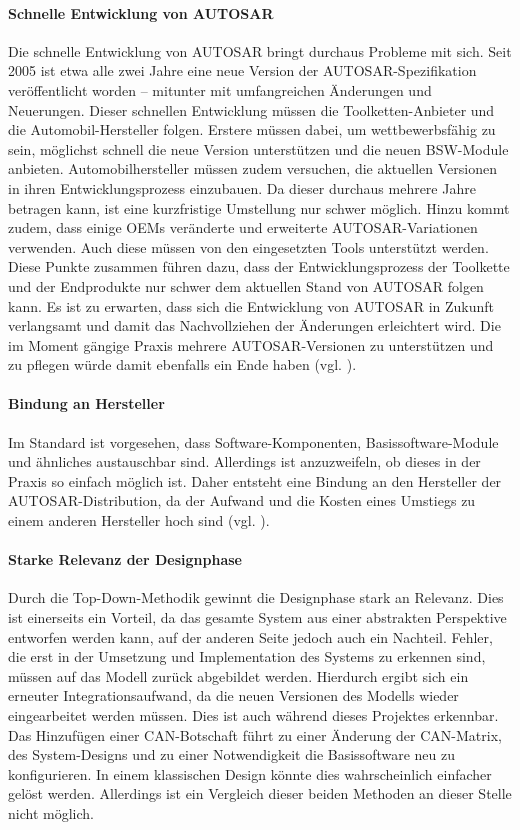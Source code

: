 \documentclass[
  a4paper,					    %
  twoside,
  DIV=calc,     				%
  bibliography=totoc,
  cleardoublepage=empty,
  ngerman,     					%
  final       					%
]{scrbook}
\begin{document}
\paragraph{Schnelle Entwicklung von AUTOSAR}
Die schnelle Entwicklung von AUTOSAR bringt durchaus Probleme mit sich. Seit 2005 ist etwa alle zwei Jahre eine neue Version der AUTOSAR-Spezifikation veröffentlicht worden -- mitunter mit umfangreichen Änderungen und Neuerungen. Dieser schnellen Entwicklung müssen die Toolketten-Anbieter und die Automobil-Hersteller folgen. Erstere müssen dabei, um wettbewerbsfähig zu sein, möglichst schnell die neue Version unterstützen und die neuen BSW-Module anbieten. Automobilhersteller müssen zudem versuchen, die aktuellen Versionen in ihren Entwicklungsprozess einzubauen. Da dieser durchaus mehrere Jahre betragen kann, ist eine kurzfristige Umstellung nur schwer möglich. Hinzu kommt zudem, dass einige OEMs veränderte und erweiterte AUTOSAR-Variationen verwenden. Auch diese müssen von den eingesetzten Tools unterstützt werden. Diese Punkte zusammen führen dazu, dass der Entwicklungsprozess der Toolkette und der Endprodukte nur schwer dem aktuellen Stand von AUTOSAR folgen kann. Es ist zu erwarten, dass sich die Entwicklung von AUTOSAR in Zukunft verlangsamt und damit das Nachvollziehen der Änderungen erleichtert wird. Die im Moment gängige Praxis mehrere AUTOSAR-Versionen zu unterstützen und zu pflegen würde damit ebenfalls ein Ende haben (vgl. \cite{as_kritik}\cite[Seite 179]{SE_Autosar}).

\paragraph{Bindung an Hersteller}
Im Standard ist vorgesehen, dass Soft\-ware-Kom\-po\-nen\-ten, Basissoftware-Module und ähnliches austauschbar sind. Allerdings ist anzuzweifeln, ob dieses in der Praxis so einfach möglich ist. Daher entsteht eine Bindung an den Hersteller der AUTOSAR-Distribution, da der Aufwand und die Kosten eines Umstiegs zu einem anderen Hersteller hoch sind (vgl. \cite{as_kritik}).

\paragraph{Starke Relevanz der Designphase}
Durch die Top-Down-Methodik gewinnt die Designphase stark an Relevanz. Dies ist einerseits ein Vorteil, da das gesamte System aus einer abstrakten Perspektive entworfen werden kann, auf der anderen Seite jedoch auch ein Nachteil. Fehler, die erst in der Umsetzung und Implementation des Systems zu erkennen sind, müssen auf das Modell zurück abgebildet werden. Hierdurch ergibt sich ein erneuter Integrationsaufwand, da die neuen Versionen des Modells wieder eingearbeitet werden müssen. Dies ist auch während dieses Projektes erkennbar. Das Hinzufügen einer CAN-Botschaft führt zu einer Änderung der CAN-Matrix, des System-Designs und zu einer Notwendigkeit die Basissoftware neu zu konfigurieren. In einem klassischen Design könnte dies wahrscheinlich einfacher gelöst werden. Allerdings ist ein Vergleich dieser beiden Methoden an dieser Stelle nicht möglich.
\end{document}
